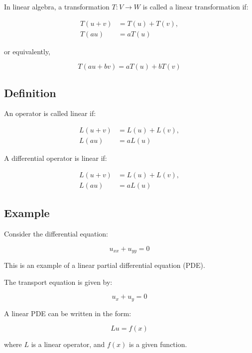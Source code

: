 \documentclass[11pt]{article}
\begin{document}
In linear algebra, a transformation \( T: V \to W \) is called a linear transformation if:

\begin{align}
    T(u + v) &= T(u) + T(v), \\
    T(au) &= aT(u)
\end{align}

or equivalently,

\begin{equation}
    T(au + bv) = aT(u) + bT(v)
\end{equation}

\subsection*{Definition}

An operator is called linear if:

\begin{align}
    L(u + v) &= L(u) + L(v), \\
    L(au) &= aL(u)
\end{align}

A differential operator is linear if:

\begin{align}
    L(u + v) &= L(u) + L(v), \\
    L(au) &= aL(u)
\end{align}

\subsection*{Example}

Consider the differential equation:

\begin{equation}
    u_{xx} + u_{yy} = 0
\end{equation}

This is an example of a linear partial differential equation (PDE).

The transport equation is given by:

\begin{equation}
    u_x + u_y = 0
\end{equation}

A linear PDE can be written in the form:

\begin{equation}
    Lu = f(x)
\end{equation}

where \( L \) is a linear operator, and \( f(x) \) is a given function.
\end{document}
